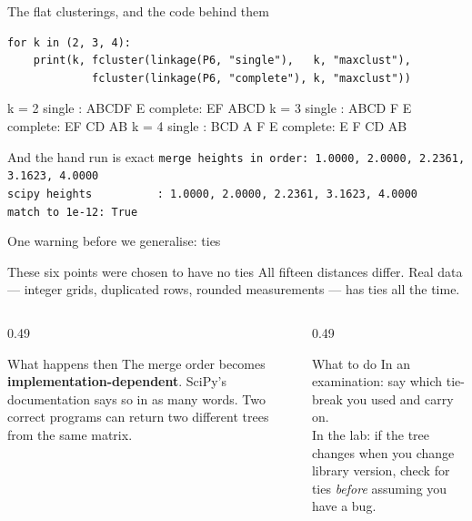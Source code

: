 \documentclass[aspectratio=169]{beamer}
\begin{document}
\begin{frame}[fragile]{The flat clusterings, and the code behind them}
\begin{lstlisting}[basicstyle=\ttfamily\scriptsize]
for k in (2, 3, 4):
    print(k, fcluster(linkage(P6, "single"),   k, "maxclust"),
             fcluster(linkage(P6, "complete"), k, "maxclust"))
\end{lstlisting}
\begin{outblk}
k = 2   single  : {ABCDF} {E}          complete: {EF} {ABCD}
k = 3   single  : {ABCD} {F} {E}       complete: {EF} {CD} {AB}
k = 4   single  : {BCD} {A} {F} {E}    complete: {E} {F} {CD} {AB}
\end{outblk}
  \vspace{0.2em}
  \begin{alertblock}{And the hand run is exact}
    \centering
    \texttt{merge heights in order: 1.0000, 2.0000, 2.2361, 3.1623, 4.0000}\\
    \texttt{scipy heights\ \ \ \ \ \ \ \ \ \ : 1.0000, 2.0000, 2.2361, 3.1623, 4.0000}\\
    \texttt{match to 1e-12: True}
  \end{alertblock}
\end{frame}

\begin{frame}[shrink=4]{One warning before we generalise: ties}
  \begin{alertblock}{These six points were chosen to have no ties}
    All fifteen distances differ. Real data --- integer grids, duplicated
    rows, rounded measurements --- has ties all the time.
  \end{alertblock}
  \begin{columns}[T]
    \begin{column}{0.49\textwidth}
      \begin{block}{What happens then}
        The merge order becomes
        \textbf{implementation-dependent}. SciPy's documentation says so in as
        many words. Two correct programs can return two different trees from
        the same matrix.
      \end{block}
    \end{column}
    \begin{column}{0.49\textwidth}
      \begin{exampleblock}{What to do}
        In an examination: say which tie-break you used and carry on.\\[0.3em]
        In the lab: if the tree changes when you change library version, check
        for ties \emph{before} assuming you have a bug.
      \end{exampleblock}
    \end{column}
  \end{columns}
\end{frame}
\end{document}

